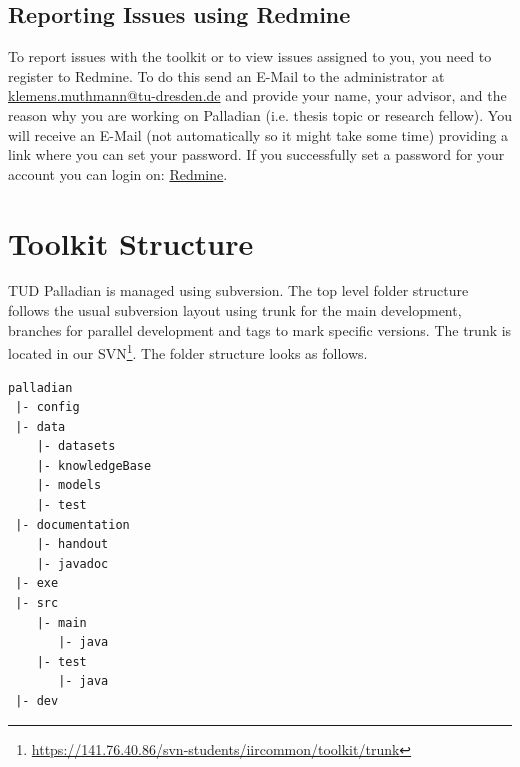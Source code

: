 \documentclass[a4paper,twoside]{book}      %
\begin{document}
\section{Reporting Issues using Redmine}
To report issues with the toolkit or to view issues assigned to you, you need to register to Redmine. To do this send an E-Mail to the administrator at \href{mailto:klemens.muthmann@tu-dresden.de}{klemens.muthmann@tu-dresden.de} and provide your name, your advisor, and the reason why you are working on Palladian (i.e. thesis topic or research fellow). You will receive an E-Mail (not automatically so it might take some time) providing a link where you can set your password. If you successfully set a password for your account you can login on: \href{http://redmine.effingo.de/}{Redmine}.

\chapter{Toolkit Structure}
\label{sec:toolkitstructure}
TUD Palladian is managed using subversion. The top level folder structure follows the usual subversion layout using trunk for the main development, branches for parallel development and tags to mark specific versions. The trunk is located in our SVN\footnote{\url{https://141.76.40.86/svn-students/iircommon/toolkit/trunk}}. The folder structure looks as follows.
\begin{verbatim}
palladian
 |- config
 |- data
    |- datasets
    |- knowledgeBase
    |- models
    |- test
 |- documentation
    |- handout
    |- javadoc
 |- exe
 |- src
    |- main
       |- java
    |- test
       |- java
 |- dev
\end{verbatim}
\end{document}
